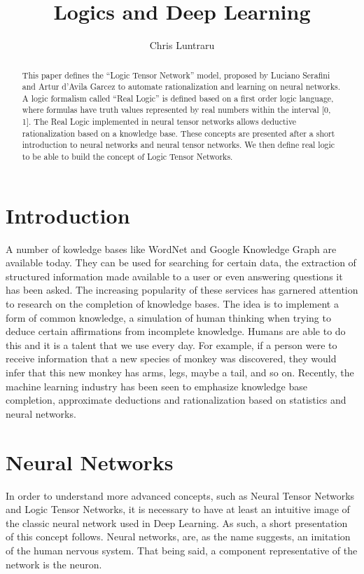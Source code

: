 \documentclass{article}
\begin{document}
\title{Logics and Deep Learning}
\author{Chris Luntraru}
\date{}
\maketitle

\begin{abstract}
This paper defines the ``Logic Tensor Network'' model, proposed by Luciano Serafini and Artur d'Avila Garcez to automate rationalization and learning on neural networks. A logic formalism called ``Real  Logic'' is defined based on a first order logic language, where formulas have truth values represented by real numbers within the interval [0, 1]. The Real Logic implemented in neural tensor networks allows deductive rationalization based on a knowledge base. These concepts are presented after a short introduction to neural networks and neural tensor networks. We then define real logic to be able to build the concept of Logic Tensor Networks.
\end{abstract}

\section{Introduction}
A number of kowledge bases like WordNet and Google Knowledge Graph are available today. They can be used for searching for certain data, the extraction of structured information made available to a user or even answering questions it has been asked. The increasing popularity of these services has garnered attention to research on the completion of knowledge bases. The idea is to implement a form of common knowledge, a simulation of human thinking when trying to deduce certain affirmations from incomplete knowledge. Humans are able to do this and it is a talent that we use every day. For example, if a person were to receive information that a new species of monkey was discovered, they would infer that this new monkey has arms, legs, maybe a tail, and so on. \cite{NTN} Recently, the machine learning industry has been seen to emphasize knowledge base completion, approximate deductions and rationalization based on statistics and neural networks. \cite{LTN}

\section{Neural Networks}
In order to understand more advanced concepts, such as Neural Tensor Networks and Logic Tensor Networks, it is necessary to have at least an intuitive image of the classic neural network used in Deep Learning. As such, a short presentation of this concept follows. Neural networks, are, as the name suggests, an imitation of the human nervous system. That being said, a component representative of the network is the neuron. \cite{Deep_Learning}
\end{document}
